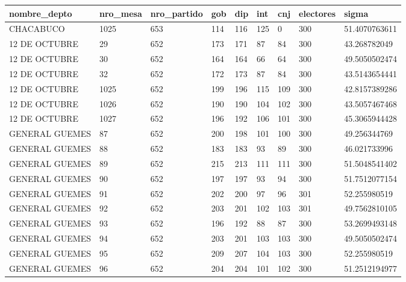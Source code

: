 \documentclass[12pt,a4paper]{article}
\begin{document}
\begin{table}[h!]
\centering
\begin{tabular}{lllllllll}
nombre\_depto  & nro\_mesa & nro\_partido & gob & dip & int & cnj & electores & sigma         \\
\hline
CHACABUCO      & 1025      & 653          & 114 & 116 & 125 & 0   & 300       & 51.4070763611 \\
12 DE OCTUBRE  & 29        & 652          & 173 & 171 & 87  & 84  & 300       & 43.268782049  \\
12 DE OCTUBRE  & 30        & 652          & 164 & 164 & 66  & 64  & 300       & 49.5050502474 \\
12 DE OCTUBRE  & 32        & 652          & 172 & 173 & 87  & 84  & 300       & 43.5143654441 \\
12 DE OCTUBRE  & 1025      & 652          & 199 & 196 & 115 & 109 & 300       & 42.8157389286 \\
12 DE OCTUBRE  & 1026      & 652          & 190 & 190 & 104 & 102 & 300       & 43.5057467468 \\
12 DE OCTUBRE  & 1027      & 652          & 196 & 192 & 106 & 101 & 300       & 45.3065944428 \\
GENERAL GUEMES & 87        & 652          & 200 & 198 & 101 & 100 & 300       & 49.256344769  \\
GENERAL GUEMES & 88        & 652          & 183 & 183 & 93  & 89  & 300       & 46.021733996  \\
GENERAL GUEMES & 89        & 652          & 215 & 213 & 111 & 111 & 300       & 51.5048541402 \\
GENERAL GUEMES & 90        & 652          & 197 & 197 & 93  & 94  & 300       & 51.7512077154 \\
GENERAL GUEMES & 91        & 652          & 202 & 200 & 97  & 96  & 301       & 52.255980519  \\
GENERAL GUEMES & 92        & 652          & 203 & 201 & 102 & 103 & 301       & 49.7562810105 \\
GENERAL GUEMES & 93        & 652          & 196 & 192 & 88  & 87  & 300       & 53.2699493148 \\
GENERAL GUEMES & 94        & 652          & 203 & 201 & 103 & 103 & 300       & 49.5050502474 \\
GENERAL GUEMES & 95        & 652          & 209 & 207 & 104 & 103 & 300       & 52.255980519  \\
GENERAL GUEMES & 96        & 652          & 204 & 204 & 101 & 102 & 300       & 51.2512194977 \\

\end{tabular}
\end{table}
\end{document}
